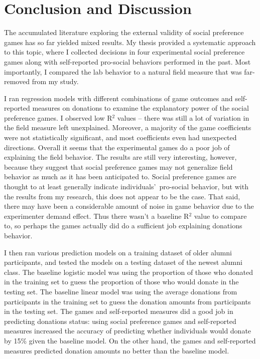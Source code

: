 \documentclass[12pt]{article}
\begin{document}
\section{Conclusion and Discussion}

The accumulated literature exploring the external validity of social preference games has so far yielded mixed results. My thesis provided a systematic approach to this topic, where I collected decisions in four experimental social preference games along with self-reported pro-social behaviors performed in the past. Most importantly, I compared the lab behavior to a natural field measure that was far-removed from my study.

I ran regression models with different combinations of game outcomes and self-reported measures on donations to examine the explanatory power of the social preference games. I observed low R$^{2}$ values -- there was still a lot of variation in the field measure left unexplained. Moreover, a majority of the game coefficients were not statistically significant, and most coefficients even had unexpected directions. Overall it seems that the experimental games do a poor job of explaining the field behavior. The results are still very interesting, however, because they suggest that social preference games may not generalize field behavior as much as it has been anticipated to. Social preference games are thought to at least generally indicate individuals\rq \ pro-social behavior, but with the results from my research, this does not appear to be the case. That said, there may have been a considerable amount of noise in game behavior due to the experimenter demand effect. Thus there wasn\rq t a baseline R$^{2}$ value to compare to, so perhaps the games actually did do a sufficient job explaining donations behavior.

I then ran various prediction models on a training dataset of older alumni participants, and tested the models on a testing dataset of the newest alumni class. The baseline logistic model was using the proportion of those who donated in the training set to guess the proportion of those who would donate in the testing set. The baseline linear model was using the average donations from participants in the training set to guess the donation amounts from participants in the testing set. The games and self-reported measures did a good job in predicting donations status:  using social preference games and self-reported measures increased the accuracy of predicting whether individuals would donate by 15\% given the baseline model. On the other hand, the games and self-reported measures predicted donation amounts no better than the baseline model.
\end{document}
